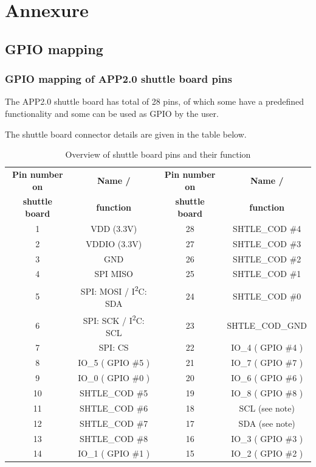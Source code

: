 \documentclass[11pt,headings=small]{scrartcl}
\begin{document}
\newpage


\newpage
\section{Annexure}
\subsection{GPIO mapping}

\subsubsection{GPIO mapping of APP2.0 shuttle board pins}

The APP2.0 shuttle board has total of 28 pins, of which some have a predefined functionality and some can be used as GPIO by the user.

The shuttle board connector details are given in the table below.

\begin{table}[H]
	\centering
	\begin{tabular}{|c|c|c|c|}
		\hline
		\textbf{Pin number on} & \textbf{Name /} & \textbf{Pin number on} & \textbf{Name /} \\
		\textbf{shuttle board} & \textbf{function} & \textbf{shuttle board} & \textbf{function} \\
		\hline\hline
		1 & VDD (3.3V) & 28 & SHTLE\_COD \#4 \\ \hline
		2 & VDDIO (3.3V) & 27 & SHTLE\_COD \#3 \\ \hline
		3 & GND & 26 & SHTLE\_COD \#2 \\ \hline
		4 & SPI MISO & 25 & SHTLE\_COD \#1 \\ \hline
		5 & SPI: MOSI / I\textsuperscript{2}C: SDA & 24 & SHTLE\_COD \#0 \\ \hline
		6 & SPI: SCK / I\textsuperscript{2}C: SCL & 23 & SHTLE\_COD\_GND \\ \hline
		7 & SPI: CS & 22 & IO\_4 ( GPIO \#4 ) \\ \hline
		8 & IO\_5 ( GPIO \#5 ) & 21 & IO\_7 ( GPIO \#7 ) \\ \hline
		9 & IO\_0 ( GPIO \#0 ) & 20 & IO\_6 ( GPIO \#6 ) \\ \hline 
		10 & SHTLE\_COD \#5 & 19 & IO\_8 ( GPIO \#8 ) \\ \hline 
		11 & SHTLE\_COD \#6 & 18 & SCL (see note) \\ \hline 
		12 & SHTLE\_COD \#7 & 17 & SDA (see note)\\ \hline 
		13 & SHTLE\_COD \#8 & 16 & IO\_3 ( GPIO \#3 ) \\ \hline
		14 & IO\_1 ( GPIO \#1 ) & 15 & IO\_2 ( GPIO \#2 ) \\ \hline
	\end{tabular}
	\caption{Overview of shuttle board pins and their function}
	\label{tab:shtbrdpins}
\end{table}
\end{document}
